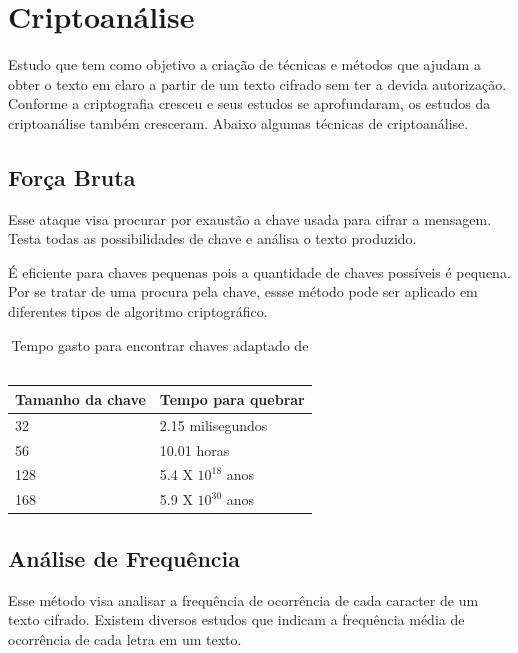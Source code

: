 %
\section{Criptoanálise}
\label{cryptanalysis}

Estudo que tem como objetivo a criação de técnicas e métodos que ajudam a obter o texto em claro a partir de um texto cifrado sem ter a devida autorização. Conforme a criptografia cresceu e seus estudos se aprofundaram, os estudos da criptoanálise também cresceram. Abaixo algumas técnicas de criptoanálise.

\subsection{Força Bruta}
\label{brute-force}

Esse ataque visa procurar por exaustão a chave usada para cifrar a mensagem. Testa todas as possibilidades de chave e análisa o texto produzido. 

É eficiente para chaves pequenas pois a quantidade de chaves possíveis é pequena. Por se tratar de uma procura pela chave, essse método pode ser aplicado em diferentes tipos de algoritmo criptográfico.

\begin{table}[h]
\centering
	\begin{tabular}{|l|l|}
		\hline
		Tamanho da chave & Tempo para quebrar \\ \hline
		32 & 2.15 milisegundos \\ \hline
		56 & 10.01 horas \\ \hline
		128 & 5.4 X $ 10 ^{18}$ anos \\ \hline
		168 & 5.9 X $ 10 ^{30}$ anos \\ \hline
	\end{tabular}
\caption[{Tempo gasto para encontrar chaves}] {Tempo gasto para encontrar chaves adaptado de ~\cite{william-stallings}}
\end{table}

\subsection{Análise de Frequência}
\label{frequency-analysis}

Esse método visa analisar a frequência de ocorrência de cada caracter de um texto cifrado. Existem diversos estudos que indicam a frequência média de ocorrência de cada letra em um texto. 

